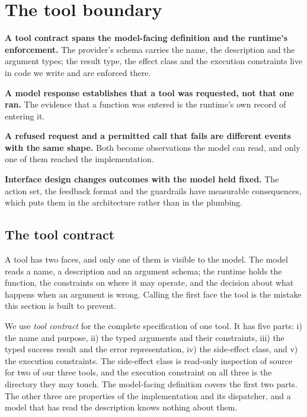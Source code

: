\section{The tool boundary}
\label{sec:boundary}

\begin{upshot}
\item \textbf{A tool contract spans the model-facing definition and the runtime's enforcement.} The
  provider's schema carries the name, the description and the argument types; the result type, the
  effect class and the execution constraints live in code we write and are enforced there.
\item \textbf{A model response establishes that a tool was requested, not that one ran.} The
  evidence that a function was entered is the runtime's own record of entering it.
\item \textbf{A refused request and a permitted call that fails are different events with the same
  shape.} Both become observations the model can read, and only one of them reached the
  implementation.
\item \textbf{Interface design changes outcomes with the model held fixed.} The action set, the
  feedback format and the guardrails have measurable consequences, which puts them in the
  architecture rather than in the plumbing.
\end{upshot}

\subsection{The tool contract}
\label{sec:boundary-contract}

A tool has two faces, and only one of them is visible to the model. The model reads a name, a
description and an argument schema; the runtime holds the function, the constraints on where it may
operate, and the decision about what happens when an argument is wrong. Calling the first face the
tool is the mistake this section is built to prevent.

\begin{definition}
\label{def:tool-contract}
We use \emph{tool contract} for the complete specification of one tool. It has five parts: i) the
name and purpose, ii) the typed arguments and their constraints, iii) the typed success result and
the error representation, iv) the side-effect class, and v) the execution constraints. The
side-effect class is read-only inspection of source for two of our three tools, and the execution
constraint on all three is the directory they may touch. The model-facing definition covers the
first two parts. The other three are properties of the implementation and its dispatcher, and a
model that has read the description knows nothing about them.
\end{definition}

